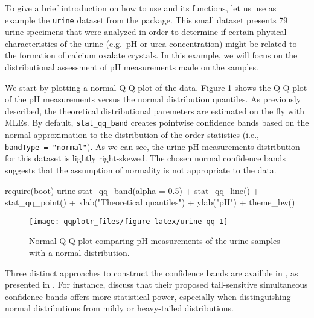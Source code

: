 To give a brief introduction on how to use  and its
functions, let us use as example the \texttt{urine} dataset from the
 package. This small dataset presents 79 urine specimens that
were analyzed in order to determine if certain physical characteristics
of the urine (e.g.~pH or urea concentration) might be related to the
formation of calcium oxalate crystals. In this example, we will focus on
the distributional assessment of pH measurements made on the samples.

We start by plotting a normal Q-Q plot of the data. Figure
\ref{fig:urine-qq} shows the Q-Q plot of the pH measurements versus the
normal distribution quantiles. As previously described, the theoretical
distributional paremeters are estimated on the fly with MLEs. By
default, \texttt{stat\_qq\_band} creates pointwise confidence bands
based on the normal approximation to the distribution of the order
statistics (i.e., \texttt{bandType\ =\ "normal"}). As we can see, the
urine pH measurements distribution for this dataset is lightly
right-skewed. The chosen normal confidence bands suggests that the
assumption of normality is not appropriate to the data.

\begin{Schunk}
\begin{Sinput}
require(boot)
urine %>% ggplot(aes(sample = ph)) + 
  stat_qq_band(alpha = 0.5) + 
  stat_qq_line() + 
  stat_qq_point() +
  xlab("Theoretical quantiles") +
  ylab("pH") +
  theme_bw()
\end{Sinput}
\begin{figure}

{\centering \texttt{[image: qqplotr\_files/figure-latex/urine-qq-1]} 

}

\caption[Normal Q-Q plot comparing pH measurements of the urine samples with a normal distribution]{Normal Q-Q plot comparing pH measurements of the urine samples with a normal distribution.}\label{fig:urine-qq}
\end{figure}
\end{Schunk}

\FloatBarrier

Three distinct approaches to construct the confidence bands are availble
in , as presented in . For
instance, \citet{Aldor-Noiman2013-xw} discuss that their proposed
tail-sensitive simultaneous confidence bands offers more statistical
power, especially when distinguishing normal distributions from mildy or
heavy-tailed distributions.


